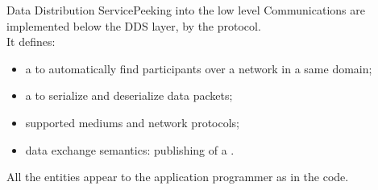 \begin{frame}{Data Distribution Service}{Peeking into the low level}
	Communications are implemented below the DDS layer, by the  protocol.\\
	It defines:
	\begin{itemize}
		\item a  to automatically find participants over a network in a same domain;
		\item a  to serialize and deserialize data packets;
		\item supported mediums and network protocols;
		\item data exchange semantics: publishing  of a .
	\end{itemize}
	\bigskip
	All the entities appear to the application programmer as  in the code.
\end{frame}
